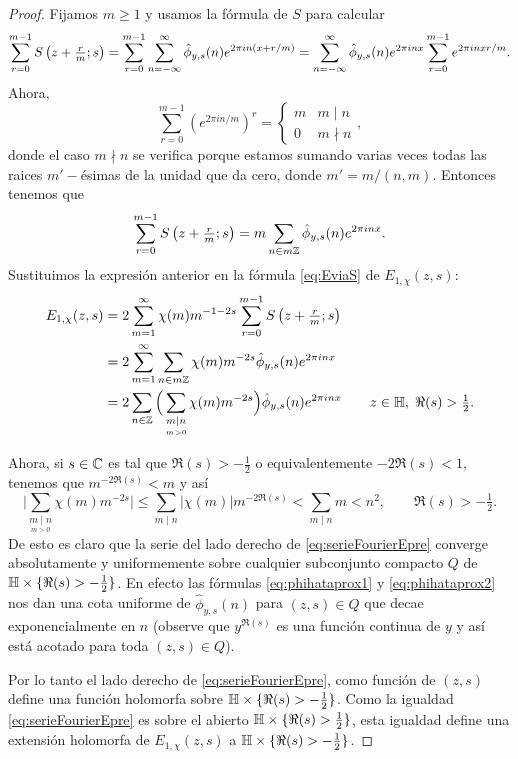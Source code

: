 \begin{proof}
  Fijamos $m\geq1$ y usamos la f\'ormula de $S$ para calcular
  \[
    \sum_{r=0}^{m-1}S\left( z+\tfrac{r}{m};s \right)
    =\sum_{r=0}^{m-1}\sum_{n=-\infty}^{\infty}\hat{\phi}_{y,s}(n)e^{2\pi in(x+r/m)}
    =\sum_{n=-\infty}^{\infty}\hat{\phi}_{y,s}(n)e^{2\pi inx}\sum_{r=0}^{m-1}e^{2\pi inxr/m}.
  \]
  Ahora,
  \[
    \sum_{r=0}^{m-1}(e^{2\pi in/m})^r=
    \begin{cases}
      m & m\mid n\\
      0 & m\nmid n
    \end{cases},
  \]
  donde el caso $m\nmid n$ se verifica porque estamos sumando varias veces todas
  las raices $m'-$\'esimas de la unidad que da cero, donde $m'=m/(n,m)$. Entonces tenemos que
  \[
    \sum_{r=0}^{m-1}S\left( z+\tfrac{r}{m};s \right)=m\sum_{n\in m\mathbb{Z}}\hat{\phi}_{y,s}(n)e^{2\pi inx}.
  \]
  Sustituimos la expresi\'on anterior en la f\'ormula \eqref{eq:EviaS} de
  $E_{1,\chi}(z,s)$:
  \begin{align}
    E_{1,\chi}(z,s)
    &=2\sum_{m=1}^{\infty}\chi(m)m^{-1-2s}\sum_{r=0}^{m-1}S\left( z+\tfrac{r}{m};s \right)\nonumber\\
    &=2\sum_{m=1}^{\infty}\sum_{n\in m\mathbb{Z}}\chi(m)m^{-2s}\hat{\phi}_{y,s}(n)e^{2\pi inx}\nonumber\\
    &=2\sum_{n\in\mathbb{Z}}\Big(\sum_{\underset{m>0}{m\mid n}}\chi(m)m^{-2s}\Big)\hat{\phi}_{y,s}(n)e^{2\pi inx}
      \qquad z\in\mathbb{H},\;\Re(s)>\tfrac{1}{2}.\label{eq:serieFourierEpre}
  \end{align}

  Ahora, si $s\in\mathbb{C}$ es tal que $\Re(s)>-\tfrac{1}{2}$ o equivalentemente $-2\Re(s)<1$,
  tenemos que $m^{-2\Re(s)}<m$ y as\'i
  \[
    \Big| \sum_{\underset{m>0}{m\mid n}}\chi(m)m^{-2s} \Big|\leq
    \sum_{m\mid n}|\chi(m)|m^{-2\Re(s)}<\sum_{m\mid n}m<n^2,\qquad\Re(s)>-\tfrac{1}{2}.
  \]
  De esto es claro que la serie del lado derecho de \eqref{eq:serieFourierEpre}
  converge absolutamente y uniformemente sobre cualquier subconjunto compacto $Q$
  de $\mathbb{H}\times\{\Re(s)>-\tfrac{1}{2}\}$. En efecto las f\'ormulas \eqref{eq:phihataprox1}
  y \eqref{eq:phihataprox2} nos dan una cota uniforme de $\hat{\phi}_{y,s}(n)$ para $(z,s)\in Q$
  que decae exponencialmente en $n$ (observe que $y^{\Re(s)}$ es una funci\'on continua
  de $y$ y as\'i est\'a acotado para toda $(z,s)\in Q$).

  Por lo tanto el lado derecho de \eqref{eq:serieFourierEpre}, como funci\'on de
  $(z,s)$ define una funci\'on  holomorfa sobre $\mathbb{H}\times\{\Re(s)>-\tfrac{1}{2}\}$.
  Como la igualdad \eqref{eq:serieFourierEpre} es sobre el abierto
  $\mathbb{H}\times\{\Re(s)>\tfrac{1}{2}\}$, esta igualdad define una extensi\'on holomorfa
  de $E_{1,\chi}(z,s)$ a $\mathbb{H}\times\{\Re(s)>-\tfrac{1}{2}\}$.


\end{proof}
